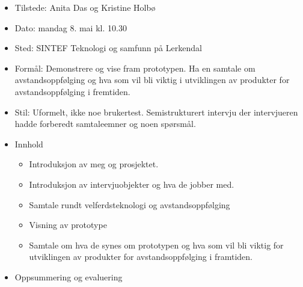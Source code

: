 \begin{itemize}
\tightlist
\item
  Tilstede: Anita Das og Kristine Holbø
\item
  Dato: mandag 8. mai kl. 10.30
\item
  Sted: SINTEF Teknologi og samfunn på Lerkendal
\item
  Formål: Demonstrere og vise fram prototypen. Ha en samtale om
  avstandsoppfølging og hva som vil bli viktig i utviklingen av
  produkter for avstandsoppfølging i fremtiden.
\item
  Stil: Uformelt, ikke noe brukertest. Semistrukturert intervju der
  intervjueren hadde forberedt samtaleemner og noen spørsmål.
\item
  Innhold

  \begin{itemize}
  \tightlist
  \item
    Introduksjon av meg og prosjektet.
  \item
    Introduksjon av intervjuobjekter og hva de jobber med.
  \item
    Samtale rundt velferdsteknologi og avstandsoppfølging
  \item
    Visning av prototype
  \item
    Samtale om hva de synes om prototypen og hva som vil bli viktig for
    utviklingen av produkter for avstandsoppfølging i framtiden.
  \end{itemize}
\item
  Oppsummering og evaluering


\end{itemize}
